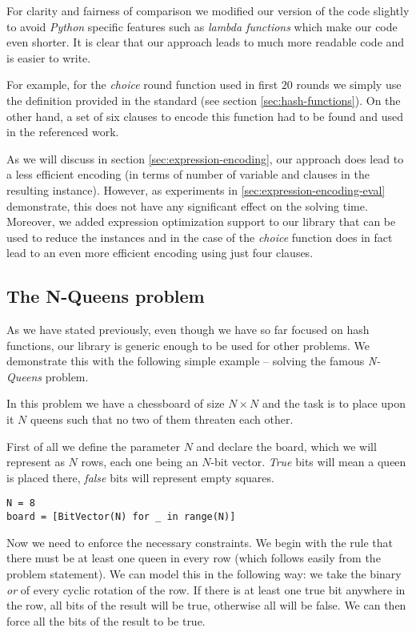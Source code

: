 For clarity and fairness of comparison we modified our version of the code slightly to avoid \emph{Python} specific features such as \emph{lambda functions} which make our code even shorter.
It is clear that our approach leads to much more readable code and is easier to write.

For example, for the \emph{choice} round function used in first $20$ rounds we simply use the definition provided in the standard (see section \ref{sec:hash-functions}).
On the other hand, a set of six clauses to encode this function had to be found and used in the referenced work.

As we will discuss in section \ref{sec:expression-encoding}, our approach does lead to a less efficient encoding (in terms of number of variable and clauses in the resulting instance).
However, as experiments in \ref{sec:expression-encoding-eval} demonstrate, this does not have any significant effect on the solving time.
Moreover, we added expression optimization support to our library that can be used to reduce the instances and in the case of the \emph{choice} function does in fact lead to an even more efficient encoding using just four clauses.

\subsection{The N-Queens problem}
As we have stated previously, even though we have so far focused on hash functions, our library is generic enough to be used for other problems.
We demonstrate this with the following simple example -- solving the famous \emph{N-Queens} problem.

In this problem we have a chessboard of size $N\times N$ and the task is to place upon it $N$ queens such that no two of them threaten each other.

First of all we define the parameter $N$ and declare the board, which we will represent as $N$ rows, each one being an $N$-bit vector.
\emph{True} bits will mean a queen is placed there, \emph{false} bits will represent empty squares.

\begin{verbatim}
N = 8
board = [BitVector(N) for _ in range(N)]
\end{verbatim}

Now we need to enforce the necessary constraints.
We begin with the rule that there must be at least one queen in every row (which follows easily from the problem statement).
We can model this in the following way: we take the binary \emph{or} of every cyclic rotation of the row.
If there is at least one true bit anywhere in the row, all bits of the result will be true, otherwise all will be false.
We can then force all the bits of the result to be true.

